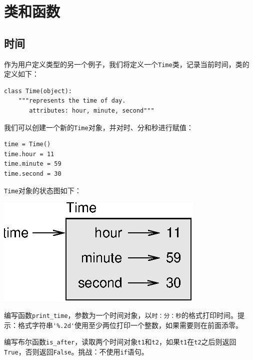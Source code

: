 \chapter{类和函数}
\label{ 时间}


\section{时间}

作为用户定义类型的另一个例子，我们将定义一个{\tt Time}类，记录当前时间，类的定义如下：


\beforeverb
\begin{verbatim}
class Time(object):
    """represents the time of day.
       attributes: hour, minute, second"""
\end{verbatim}
\afterverb
%
我们可以创建一个新的{\tt Time}对象，并对时、分和秒进行赋值：

\beforeverb
\begin{verbatim}
time = Time()
time.hour = 11
time.minute = 59
time.second = 30
\end{verbatim}
\afterverb
%
{\tt Time}对象的状态图如下：


\beforefig
\centerline{\includegraphics{figs/time.eps}}
\afterfig

\begin{ex}
\label{printtime}
编写函数\verb"print_time"，参数为一个时间对象，以{\tt 时：分：秒}的格式打印时间。提示：格式字符串\verb"'%.2d'"使用至少两位打印一个整数，如果需要则在前面添零。
\end{ex}

\begin{ex}
\label{is_after}

编写布尔函数\verb"is_after"，读取两个时间对象{\tt t1}和{\tt t2}，如果{\tt t1}在{\tt t2}之后则返回{\tt True}，否则返回{\tt False}。挑战：不使用{\tt if}语句。
\end{ex}



